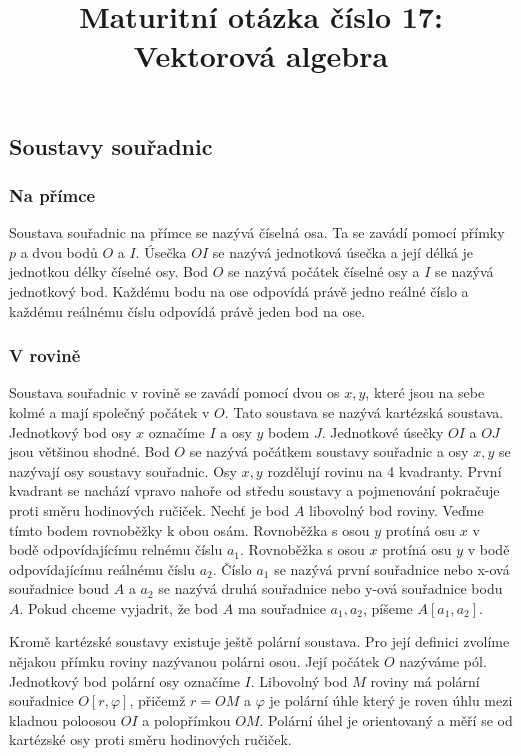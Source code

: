 \documentclass[12pt]{article}
\title{Maturitní otázka číslo 17: Vektorová algebra}
\author{}
\date{}
\begin{document}
\maketitle

\subsection*{Soustavy souřadnic}
\subsubsection*{Na přímce}
Soustava souřadnic na přímce se nazývá číselná osa. Ta se zavádí pomocí přímky $p$ a dvou bodů $O$ a
$I$. Úsečka $OI$ se nazývá jednotková úsečka a její délká je jednotkou délky číselné osy. Bod $O$ se
nazývá počátek číselné osy a $I$ se nazývá jednotkový bod. Každému bodu na ose odpovídá právě jedno
reálné číslo a každému reálnému číslu odpovídá právě jeden bod na ose.
\subsubsection*{V rovině}
Soustava souřadnic v rovině se zavádí pomocí dvou os $x, y$, které jsou na sebe kolmé a mají
společný počátek v $O$. Tato soustava se nazývá kartézská soustava.
Jednotkový bod osy $x$ označíme $I$ a osy $y$ bodem $J$. Jednotkové úsečky
$OI$ a $OJ$ jsou většinou shodné. Bod $O$ se nazývá počátkem soustavy souřadnic a osy $x, y$ se
nazývají osy soustavy souřadnic. Osy $x, y$ rozdělují rovinu na 4 kvadranty. První kvadrant se nachází
vpravo nahoře od středu soustavy a pojmenování pokračuje proti směru hodinových ručiček. Nechť je bod
$A$ libovolný bod roviny. Veďme tímto bodem rovnoběžky k obou osám. Rovnoběžka s osou $y$ protíná
osu $x$ v bodě odpovídajícímu relnému číslu $a_1$. Rovnoběžka s osou $x$ protíná osu $y$ v bodě
odpovídajícímu reálnému číslu $a_2$. Číslo $a_1$ se nazývá první souřadnice nebo x-ová souřadnice
boud $A$ a $a_2$ se nazývá druhá souřadnice nebo y-ová souřadnice bodu $A$. Pokud chceme vyjadrit,
že bod $A$ ma souřadnice $a_1, a_2$, píšeme $A[a_1, a_2]$.

Kromě kartézské soustavy existuje ještě polární soustava. Pro její definici zvolíme nějakou přímku
roviny nazývanou polárni osou. Její počátek $O$ nazýváme pól. Jednotkový bod polární osy označíme
$I$. Libovolný bod $M$ roviny má polární souřadnice $O[r, \varphi]$, přičemž $r = OM$ a $\varphi$ je
polární úhle který je roven úhlu mezi kladnou poloosou $OI$ a polopřímkou $OM$. Polární úhel je
orientovaný a měří se od kartézské osy proti směru hodinových ručiček.
\end{document}
